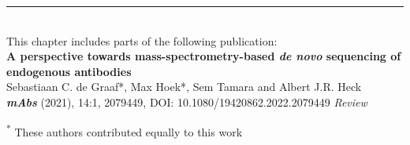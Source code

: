  \label{ch-6}

\begin{flushleft}
  \vspace*{\fill}
  \rule{\textwidth}{1pt}\\[0cm]
  This chapter includes parts of the following publication:\\
  \textbf{A perspective towards mass-spectrometry-based \emph{de novo} sequencing of endogenous antibodies}\\
  \footnotesize
  \vspace{0.3cm}
  Sebastiaan C. de Graaf*, Max Hoek*, Sem Tamara and Albert J.R. Heck \\
  \textbf{\emph{mAbs}} (2021), 14:1, 2079449, DOI: 10.1080/19420862.2022.2079449 \emph{Review}\\
  \vspace{0.3cm}

  \textsuperscript{*} These authors contributed equally to this work

\end{flushleft}

\newpage
\thumbforchapter

